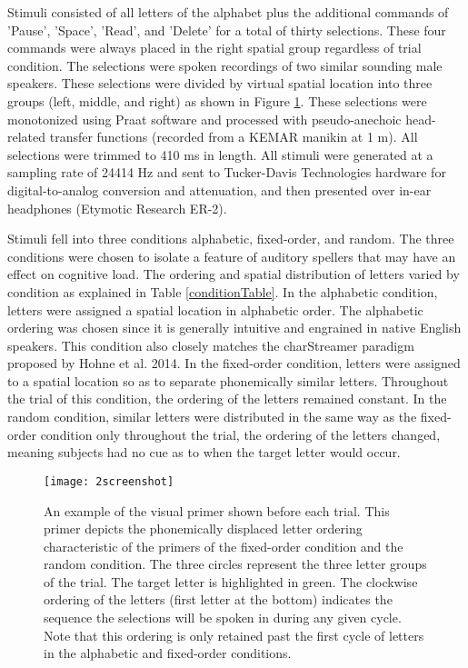 \documentclass[10pt]{article}
\begin{document}
Stimuli consisted of all letters of the alphabet plus the
additional commands of 'Pause', 'Space', 'Read', and 'Delete'
for a total of thirty selections.  These four commands were
always placed in the right spatial group regardless of trial
condition.  The selections were spoken recordings of two
similar sounding male speakers.  These selections were divided
by virtual spatial location into three groups (left, middle,
and right) as shown in Figure \ref{screenshot}.  These
selections were monotonized using Praat software and processed
with pseudo-anechoic head-related transfer functions (recorded
from a KEMAR manikin at 1 m).  All selections were trimmed to
410 ms in length.  All stimuli were generated at a
sampling rate of 24414 Hz and sent to Tucker-Davis
Technologies hardware for digital-to-analog conversion and
attenuation, and then presented over in-ear headphones
(Etymotic Research ER-2).

Stimuli fell into three conditions alphabetic, fixed-order,
and random.  The three conditions were chosen to isolate a
feature of auditory spellers that may have an effect on
cognitive load.  The ordering and spatial distribution of
letters varied by condition as explained in Table
\ref{conditionTable}.  In the alphabetic condition, letters
were assigned a spatial location in alphabetic order.  The
alphabetic ordering was chosen since it is generally intuitive
and engrained in native English speakers.  This condition
also closely matches the charStreamer paradigm proposed by
Hohne et al.  2014\cite{Hohne2014}.  In the fixed-order
condition, letters were assigned to a spatial location so as to
separate phonemically similar letters.  Throughout the trial
of this condition, the ordering of the letters remained
constant.  In the random condition, similar letters were
distributed in the same way as the fixed-order condition only
throughout the trial, the ordering of the letters changed,
meaning subjects had no cue as to when the target letter would
occur. 

\begin{figure}[t]
  \centering
  \texttt{[image: 2screenshot]}
  \caption{ An example of the visual primer shown before each
      trial.  This primer depicts the phonemically displaced
      letter ordering characteristic of the primers of the
      fixed-order condition and the random condition. The three circles
      represent the three letter groups of the trial.  The
      target letter is highlighted in green.  The clockwise
      ordering of the letters (first letter at the bottom)
      indicates the sequence the selections will be spoken in
  during any given cycle.  Note that this ordering is only
  retained past the first cycle of letters in the alphabetic
  and fixed-order conditions.}
  \label{screenshot}
\end{figure}
\end{document}
